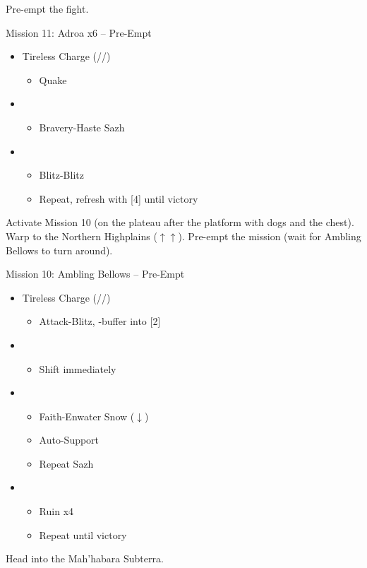 \renewcommand{\third}{[3] Hero's Charge (\syn/\med/\com)}
\renewcommand{\fourth}{[4] Tireless Charge (\com/\med/\com)}

Pre-empt the fight.
\vfill
\begin{battle}{Mission 11: Adroa x6 -- Pre-Empt}
	\begin{itemize}
		\item \fourth
			\begin{itemize}
				\item Quake
			\end{itemize}
		\item \first
			\begin{itemize}
				\item Bravery-Haste Sazh
			\end{itemize}
		\item \fifth
			\begin{itemize}
				\item Blitz-Blitz
				\item Repeat, refresh with [4] until victory
			\end{itemize}
	\end{itemize}
\end{battle}

Activate Mission 10 (on the plateau after the platform with dogs and the chest).
Warp to the Northern Highplains ($\uparrow\uparrow$).
Pre-empt the mission (wait for Ambling Bellows to turn around).

\begin{battle}{Mission 10: Ambling Bellows -- Pre-Empt}
	\begin{itemize}
		\item \fourth
			\begin{itemize}
				\item Attack-Blitz, \rav-buffer into [2]
			\end{itemize}
		\item \second
			\begin{itemize}
				\item Shift immediately
			\end{itemize}
		\item \first
			\begin{itemize}
				\item Faith-Enwater Snow ($\downarrow$)
				\item Auto-Support
				\item Repeat Sazh
			\end{itemize}
		\item \fifth
			\begin{itemize}
				\item Ruin x4
				\item Repeat until victory
			\end{itemize}
	\end{itemize}
\end{battle}

Head into the Mah'habara Subterra.